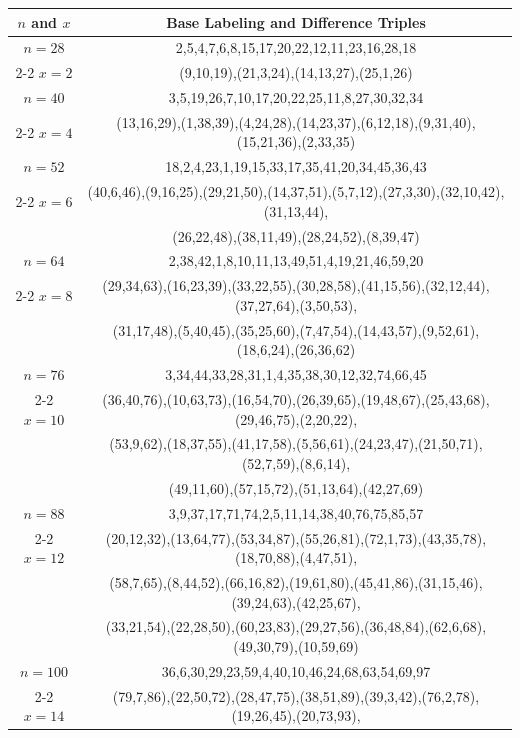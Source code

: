 \begin{tabular}{| c | c |}
\hline
\(n\) and \(x\) & Base Labeling and Difference Triples\\
\hline
\(n=28\) & 
2,5,4,7,6,8,15,17,20,22,12,11,23,16,28,18\\
\cline{2-2}
\(x=2\)
&(9,10,19),(21,3,24),(14,13,27),(25,1,26)\\
\hline 
\(n=40\) & 
3,5,19,26,7,10,17,20,22,25,11,8,27,30,32,34\\
\cline{2-2}
\(x=4\)
&(13,16,29),(1,38,39),(4,24,28),(14,23,37),(6,12,18),(9,31,40),(15,21,36),(2,33,35)\\
\hline 
\(n=52\) & 
18,2,4,23,1,19,15,33,17,35,41,20,34,45,36,43\\
\cline{2-2}
\(x=6\)
&(40,6,46),(9,16,25),(29,21,50),(14,37,51),(5,7,12),(27,3,30),(32,10,42),(31,13,44),\\
&(26,22,48),(38,11,49),(28,24,52),(8,39,47)\\
\hline 
\(n=64\) & 
2,38,42,1,8,10,11,13,49,51,4,19,21,46,59,20\\
\cline{2-2}
\(x=8\)
&(29,34,63),(16,23,39),(33,22,55),(30,28,58),(41,15,56),(32,12,44),(37,27,64),(3,50,53),\\
&(31,17,48),(5,40,45),(35,25,60),(7,47,54),(14,43,57),(9,52,61),(18,6,24),(26,36,62)\\
\hline 
\(n=76\) & 
3,34,44,33,28,31,1,4,35,38,30,12,32,74,66,45\\
\cline{2-2}
\(x=10\)
&(36,40,76),(10,63,73),(16,54,70),(26,39,65),(19,48,67),(25,43,68),(29,46,75),(2,20,22),\\
&(53,9,62),(18,37,55),(41,17,58),(5,56,61),(24,23,47),(21,50,71),(52,7,59),(8,6,14),\\
&(49,11,60),(57,15,72),(51,13,64),(42,27,69)\\
\hline 
\(n=88\) & 
3,9,37,17,71,74,2,5,11,14,38,40,76,75,85,57\\
\cline{2-2}
\(x=12\)
&(20,12,32),(13,64,77),(53,34,87),(55,26,81),(72,1,73),(43,35,78),(18,70,88),(4,47,51),\\
&(58,7,65),(8,44,52),(66,16,82),(19,61,80),(45,41,86),(31,15,46),(39,24,63),(42,25,67),\\
&(33,21,54),(22,28,50),(60,23,83),(29,27,56),(36,48,84),(62,6,68),(49,30,79),(10,59,69)\\
\hline 
\(n=100\) & 
36,6,30,29,23,59,4,40,10,46,24,68,63,54,69,97\\
\cline{2-2}
\(x=14\)
&(79,7,86),(22,50,72),(28,47,75),(38,51,89),(39,3,42),(76,2,78),(19,26,45),(20,73,93),\\

\end{tabular}
